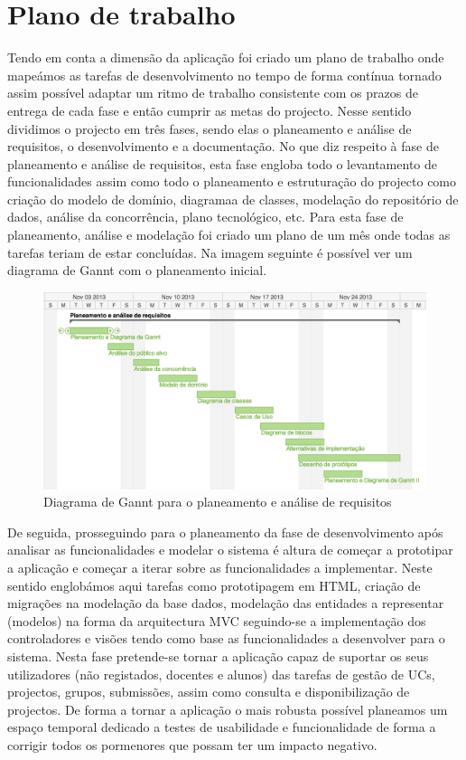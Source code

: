 \section{Plano de trabalho}
Tendo em conta a dimensão da aplicação foi criado um plano de trabalho onde mapeámos as tarefas
de desenvolvimento no tempo de forma contínua tornado assim possível adaptar um ritmo de trabalho
consistente com os prazos de entrega de cada fase e então cumprir as metas do projecto.
Nesse sentido dividimos o projecto em três fases, sendo elas o planeamento e análise de requisitos, o
desenvolvimento e a documentação.
No que diz respeito à fase de planeamento e análise de requisitos, esta fase engloba todo o levantamento 
de funcionalidades assim como todo o planeamento e estruturação do projecto como
criação do modelo de domínio, diagramaa de classes, modelação do repositório de dados,
análise da concorrência, plano tecnológico, etc.
Para esta fase de planeamento, análise e modelação foi criado um plano de um mês onde todas as tarefas 
teriam de estar concluídas. Na imagem seguinte é possível ver um diagrama de Gannt com
o planeamento inicial.



\begin{figure}[htbp] 
	\centering
	\includegraphics[width=1\textwidth]{images/plano_trabalho_1.png}
 	\caption{Diagrama de Gannt para o planeamento e análise de requisitos}
 	\label{fig: workplan1}
\end{figure}


De seguida, prosseguindo para o planeamento da fase de desenvolvimento após 
analisar as funcionalidades e modelar o sistema  é altura de começar a 
prototipar a aplicação e começar a iterar sobre as funcionalidades a 
implementar. Neste sentido englobámos aqui tarefas como prototipagem em HTML, 
criação de migrações na modelação da base dados, modelação das entidades a 
representar (modelos) na forma da arquitectura MVC seguindo-se a implementação dos 
controladores e visões tendo como base as funcionalidades a desenvolver para o 
sistema.  Nesta fase pretende-se tornar a aplicação capaz de suportar os seus 
utilizadores (não registados, docentes e alunos) das tarefas de gestão de UCs, 
projectos, grupos, submissões, assim como consulta e disponibilização de 
projectos. De forma a tornar a aplicação o mais robusta possível planeamos um 
espaço temporal dedicado a testes de usabilidade e funcionalidade de forma a 
corrigir todos os pormenores que possam ter um impacto negativo.


